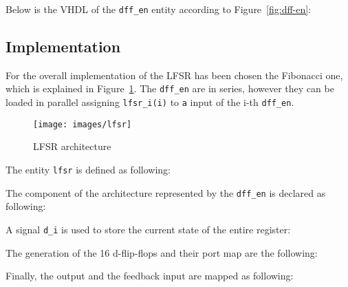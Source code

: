 \documentclass[11pt,a4paper,oneside, openright]{article}
\begin{document}
Below is the VHDL of the \texttt{dff\_en} entity according to Figure~\ref{fig:dff-en}:



\subsection{Implementation}
For the overall implementation of the LFSR has been chosen the Fibonacci one, which is explained in Figure~\ref{fig:lfsr}. The \texttt{dff\_en} are in series, however they can be loaded in parallel assigning \texttt{lfsr\_i(i)} to \texttt{a} input of the i-th \texttt{dff\_en}.

\begin{figure}[h]
    \centering
    \texttt{[image: images/lfsr]}
    \caption{LFSR architecture}
    \label{fig:lfsr}
\end{figure}

The entity \texttt{lfsr} is defined as following:



The component of the architecture represented by the \texttt{dff\_en} is declared as following:



A signal \texttt{d\_i} is used to store the current state of the entire register:



The generation of the 16 d-flip-flops and their port map are the following:



Finally, the output and the feedback input are mapped as following:



\newpage
\end{document}
